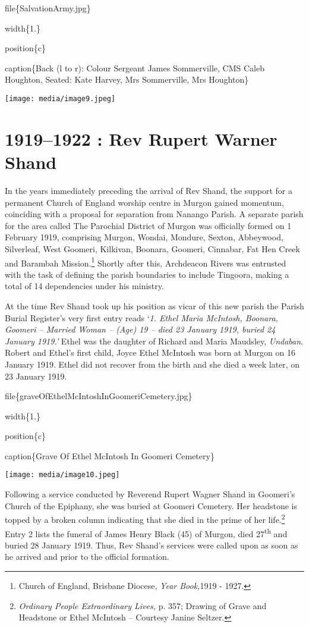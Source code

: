 file\{SalvationArmy.jpg\}

width\{1.\}

position\{c\}

caption\{Back (l to r): Colour Sergeant James Sommerville, CMS Caleb Houghton, Seated: Kate Harvey, Mrs Sommerville, Mrs Houghton\}

\texttt{[image: media/image9.jpeg]}

\hypertarget{rev-rupert-warner-shand}{%
\section{1919--1922 : Rev Rupert Warner Shand}\label{rev-rupert-warner-shand}}

In the years immediately preceding the arrival of Rev Shand, the support for a permanent Church of England worship centre in Murgon gained momentum, coinciding with a proposal for separation from Nanango Parish. A separate parish for the area called The Parochial District of Murgon was officially formed on 1 February 1919, comprising Murgon, Wondai, Mondure, Sexton, Abbeywood, Silverleaf, West Goomeri, Kilkivan, Boonara, Goomeri, Cinnabar, Fat Hen Creek and Barambah Mission.\footnote{Church of England, Brisbane Diocese, \emph{Year Book,}1919 - 1927.} Shortly after this, Archdeacon Rivers was entrusted with the task of defining the parish boundaries to include Tingoora, making a total of 14 dependencies under his ministry.

At the time Rev Shand took up his position as vicar of this new parish the Parish Burial Register's very first entry reads `\emph{1. Ethel Maria McIntosh, Boonara, Goomeri -- Married Woman -- (Age) 19 -- died 23 January 1919, buried 24 January 1919.'} Ethel was the daughter of Richard and Maria Maudsley, \emph{Undaban}. Robert and Ethel's first child, Joyce Ethel McIntosh was born at Murgon on 16 January 1919. Ethel did not recover from the birth and she died a week later, on 23 January 1919.

file\{graveOfEthelMcIntoshInGoomeriCemetery.jpg\}

width\{1.\}

position\{c\}

caption\{Grave Of Ethel McIntosh In Goomeri Cemetery\}

\texttt{[image: media/image10.jpeg]}

Following a service conducted by Reverend Rupert Wagner Shand in Goomeri's Church of the Epiphany, she was buried at Goomeri Cemetery. Her headstone is topped by a broken column indicating that she died in the prime of her life.\footnote{\emph{Ordinary People Extraordinary Lives,} p. 357; Drawing of Grave and Headstone or Ethel McIntosh -- Courtesy Janine Seltzer.} Entry 2 lists the funeral of James Henry Black (45) of Murgon, died 27\textsuperscript{th} and buried 28 January 1919. Thus, Rev Shand's services were called upon as soon as he arrived and prior to the official formation.

